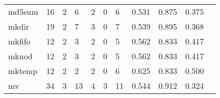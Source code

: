 \begin{longtable}{lp{1.2cm}p{1.2cm}p{1.2cm}p{1.2cm}p{1.2cm}p{1.2cm}p{1.2cm}p{1.2cm}p{1.2cm}p{1.2cm}}
md5sum    &                                    16 &                                                  2 &                                                  6 &                                                  2 &                                                  0 &                                                  6 &                                         0.531 &                                              0.875 &                                              0.375 \\
mkdir     &                                    19 &                                                  2 &                                                  7 &                                                  3 &                                                  0 &                                                  7 &                                         0.539 &                                              0.895 &                                              0.368 \\
mkfifo    &                                    12 &                                                  2 &                                                  3 &                                                  2 &                                                  0 &                                                  5 &                                         0.562 &                                              0.833 &                                              0.417 \\
mknod     &                                    12 &                                                  2 &                                                  3 &                                                  2 &                                                  0 &                                                  5 &                                         0.562 &                                              0.833 &                                              0.417 \\
mktemp    &                                    12 &                                                  2 &                                                  2 &                                                  2 &                                                  0 &                                                  6 &                                         0.625 &                                              0.833 &                                              0.500 \\
mv        &                                    34 &                                                  3 &                                                 13 &                                                  4 &                                                  3 &                                                 11 &                                         0.544 &                                              0.912 &                                              0.324 \\

\end{longtable}
